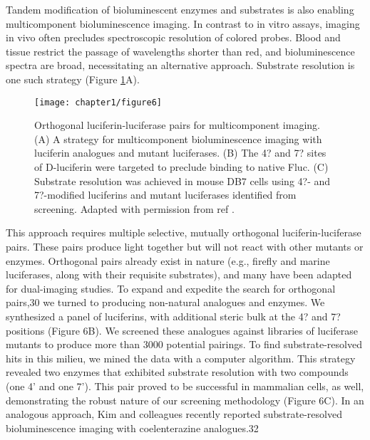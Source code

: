 Tandem modification of bioluminescent enzymes and
substrates is also enabling multicomponent bioluminescence
imaging. In contrast to in vitro assays, imaging in vivo often
precludes spectroscopic resolution of colored probes. Blood
and tissue restrict the passage of wavelengths shorter than red,\cite{Zhao:2005if}
and bioluminescence spectra are broad,\cite{Rumyantsev:2016fd} necessitating an
alternative approach. Substrate resolution is one such strategy
(Figure \ref{fig:jacs_summary}A). 

\begin{figure}[htbp]
\texttt{[image: chapter1/figure6]}
\centering
\caption[Orthogonal luciferin-luciferase pairs for multicomponent imaging]{Orthogonal luciferin-luciferase pairs for multicomponent imaging. (A) A strategy for multicomponent bioluminescence imaging with
luciferin analogues and mutant luciferases. (B) The 4? and 7? sites of D-luciferin were targeted to preclude binding to native Fluc. (C) Substrate
resolution was achieved in mouse DB7 cells using 4?- and 7?-modified luciferins and mutant luciferases identified from screening. Adapted with
permission from ref \cite{Jones:2017be}.}
  \label{fig:jacs_summary}
\end{figure}

This approach requires multiple selective,
mutually orthogonal luciferin-luciferase pairs. These pairs
produce light together but will not react with other mutants or
enzymes. Orthogonal pairs already exist in nature (e.g., firefly
and marine luciferases, along with their requisite substrates),
and many have been adapted for dual-imaging studies.
To expand and expedite the search for orthogonal pairs,30 we
turned to producing non-natural analogues and enzymes. We
synthesized a panel of luciferins, with additional steric bulk at
the 4? and 7? positions (Figure 6B). We screened these
analogues against libraries of luciferase mutants to produce
more than 3000 potential pairings. To find substrate-resolved
hits in this milieu, we mined the data with a computer
algorithm. This strategy revealed two enzymes that exhibited
substrate resolution with two compounds (one 4' and one 7').
This pair proved to be successful in mammalian cells, as well,
demonstrating the robust nature of our screening methodology
(Figure 6C). In an analogous approach, Kim and colleagues
recently reported substrate-resolved bioluminescence imaging
with coelenterazine analogues.32
